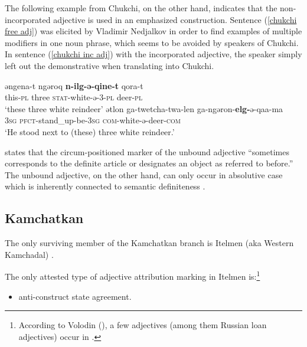 The following example from Chukchi, on the other hand, indicates that the non-incorporated adjective is used in an emphasized construction. Sentence (\ref{chukchi free adj}) was elicited by Vladimir Nedjalkov \citep[cited as a personal communication in][330]{rijkhoff2002} in order to find examples of multiple modifiers in one noun phrase, which seems to be avoided by speakers of Chukchi. In sentence (\ref{chukchi inc adj}) with the incorporated adjective, the speaker simply left out the demonstrative when translating into Chukchi.
\begin{exe}
\begin{xlist}
\ex
\label{chukchi free adj}
\gll	əngena-t ngəroq \textbf{n-ilg-ə-qine-t} qora-t\\
	this-\textsc{pl} three \textsc{stat}-white-ə-3-\textsc{pl} deer-\textsc{pl}\\
\glt	‘these three white reindeer’
\ex
\label{chukchi inc adj}
\gll	ətlon ga-twetcha-twa-len ga-ngəron-\textbf{elg-}ə-qaa-ma\\
	\textsc{3sg} \textsc{pfct}-stand\_up-be-\textsc{3sg} \textsc{com}-white-ə-deer-\textsc{com}\\
\glt	‘He stood next to (these) three white reindeer.’
\end{xlist}
\end{exe}
\citet[716]{bogoras1922} states that the circum-positioned marker of the unbound adjective “sometimes corresponds to the definite article or designates an object as referred to before.” The unbound adjective, on the other hand, can only occur in absolutive case which is inherently connected to semantic definiteness \citep[cf.][207, passim]{dunn1999}.

\subsection{Kamchatkan}
The only surviving member of the Kamchatkan branch is Itelmen (aka Western Kamchadal) \citep[224]{salminen2007}.

The only attested type of adjective attribution marking in Itelmen is:\footnote{According to Volodin (\citeyear{volodin1997}), a few adjectives (among them Russian loan adjectives) occur in .}
\begin{itemize}
\item anti\hyp{}construct state agreement.
\end{itemize}


